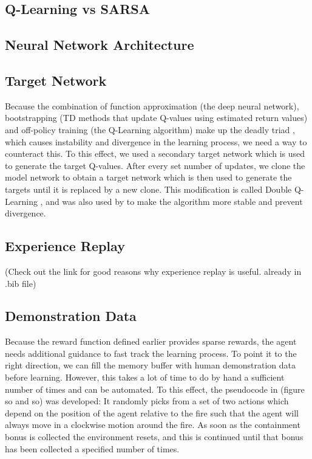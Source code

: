 \subsection{Q-Learning vs SARSA}\label{sec:q_sarsa}

\subsection{Neural Network Architecture}\label{sec:architecture}

\subsection{Target Network}\label{sec:target_network}
Because the combination of function approximation (the deep neural network), bootstrapping (TD methods that update Q-values using estimated return values) and off-policy training (the Q-Learning algorithm) make up the deadly triad \citep{sutton_barto_2018}, which causes instability and divergence in the learning process, we need a way to counteract this. To this effect, we used a secondary target network which is used to generate the target Q-values. After every set number of updates, we clone the model network to obtain a target network which is then used to generate the targets until it is replaced by a new clone. This modification is called Double Q-Learning \citep{NIPS2010_3964}, and was also used by \citep{mnih2015human} to make the algorithm more stable and prevent divergence.

\subsection{Experience Replay}\label{sec:exp_replay}
(Check out the link for good reasons why experience replay is useful. already in .bib file)

\subsection{Demonstration Data}\label{sec:demo_data}
Because the reward function defined earlier provides sparse rewards, the agent needs additional guidance to fast track the learning process. To point it to the right direction, we can fill the memory buffer with human demonstration data before learning. However, this takes a lot of time to do by hand a sufficient number of times and can be automated. To this effect, the pseudocode in (figure so and so) was developed: It randomly picks from a set of two actions which depend on the position of the agent relative to the fire such that the agent will always move in a clockwise motion around the fire. As soon as the containment bonus is collected the environment resets, and this is continued until that bonus has been collected a specified number of times.

